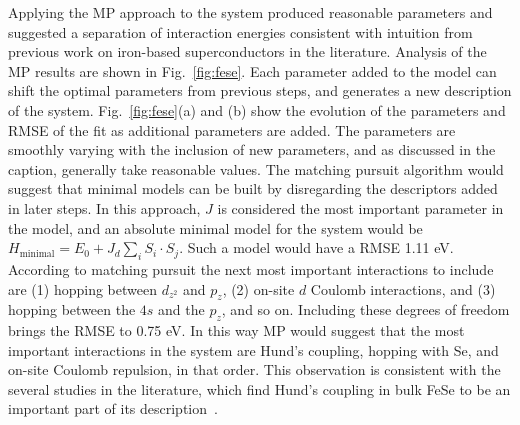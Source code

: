 Applying the MP approach to the system produced reasonable parameters and suggested a separation of interaction energies consistent with intuition from previous work on iron-based superconductors in the literature.
Analysis of the MP results are shown in Fig.~\ref{fig:fese}. 
Each parameter added to the model can shift the optimal parameters from previous steps, and generates a new description of the system. 
Fig.~\ref{fig:fese}(a) and (b) show the evolution of the parameters and RMSE of the fit as additional parameters are added.
The parameters are smoothly varying with the inclusion of new parameters, and as discussed in the caption, generally take reasonable values.
The matching pursuit algorithm would suggest that minimal models can be built by disregarding the descriptors added in later steps.
In this approach, $J$ is considered the most important parameter in the model, and an absolute minimal model for the system would be $H_\text{minimal} = E_0 + J_d \sum_i S_i \cdot S_j$. 
Such a model would have a RMSE 1.11 eV. 
According to matching pursuit the next most important interactions to include are (1) hopping between $d_{z^2}$ and $p_z$, (2) on-site $d$ Coulomb interactions, and (3) hopping between the $4s$ and the $p_z$, and so on. 
Including these degrees of freedom brings the RMSE to 0.75 eV.
In this way MP would suggest that the most important interactions in the system are Hund's coupling, hopping with Se, and on-site Coulomb repulsion, in that order.
This observation is consistent with the several studies in the literature, which find Hund's coupling in bulk FeSe to be an important part of its description~\cite{hunds}.
